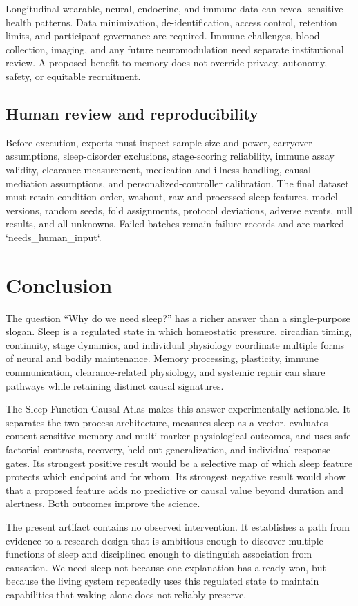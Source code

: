 \documentclass[conference]{IEEEtran}
\begin{document}
Longitudinal wearable, neural, endocrine, and immune data can reveal sensitive health patterns. Data minimization, de-identification, access control, retention limits, and participant governance are required. Immune challenges, blood collection, imaging, and any future neuromodulation need separate institutional review. A proposed benefit to memory does not override privacy, autonomy, safety, or equitable recruitment.

\subsection{Human review and reproducibility}
Before execution, experts must inspect sample size and power, carryover assumptions, sleep-disorder exclusions, stage-scoring reliability, immune assay validity, clearance measurement, medication and illness handling, causal mediation assumptions, and personalized-controller calibration. The final dataset must retain condition order, washout, raw and processed sleep features, model versions, random seeds, fold assignments, protocol deviations, adverse events, null results, and all unknowns. Failed batches remain failure records and are marked `needs\_human\_input`.

\section{Conclusion}
The question “Why do we need sleep?” has a richer answer than a single-purpose slogan. Sleep is a regulated state in which homeostatic pressure, circadian timing, continuity, stage dynamics, and individual physiology coordinate multiple forms of neural and bodily maintenance. Memory processing, plasticity, immune communication, clearance-related physiology, and systemic repair can share pathways while retaining distinct causal signatures.

The Sleep Function Causal Atlas makes this answer experimentally actionable. It separates the two-process architecture, measures sleep as a vector, evaluates content-sensitive memory and multi-marker physiological outcomes, and uses safe factorial contrasts, recovery, held-out generalization, and individual-response gates. Its strongest positive result would be a selective map of which sleep feature protects which endpoint and for whom. Its strongest negative result would show that a proposed feature adds no predictive or causal value beyond duration and alertness. Both outcomes improve the science.

The present artifact contains no observed intervention. It establishes a path from evidence to a research design that is ambitious enough to discover multiple functions of sleep and disciplined enough to distinguish association from causation. We need sleep not because one explanation has already won, but because the living system repeatedly uses this regulated state to maintain capabilities that waking alone does not reliably preserve.
\end{document}
